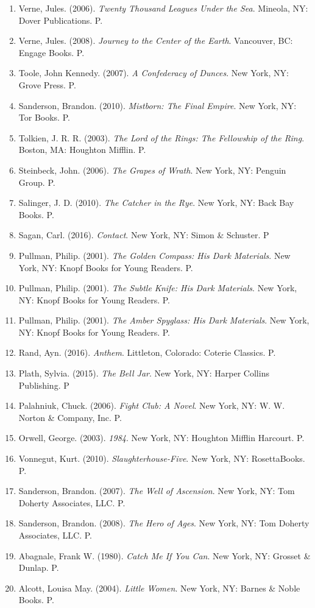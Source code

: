 \documentclass[11pt,a4paper]{article}
\begin{document}
\begin{enumerate}
   \item Verne, Jules. (2006). \textit{Twenty Thousand Leagues Under the Sea}. Mineola, NY: Dover Publications. P.
   \item Verne, Jules. (2008). \textit{Journey to the Center of the Earth}. Vancouver, BC: Engage Books. P.
   \item Toole, John Kennedy. (2007). \textit{A Confederacy of Dunces}. New York, NY: Grove Press. P.
   \item Sanderson, Brandon. (2010). \textit{Mistborn: The Final Empire}. New York, NY: Tor Books. P.
   \item Tolkien, J. R. R. (2003). \textit{The Lord of the Rings: The Fellowship of the Ring}. Boston, MA: Houghton Mifflin. P.
   \item Steinbeck, John. (2006). \textit{The Grapes of Wrath}. New York, NY: Penguin Group. P.
   \item Salinger, J. D. (2010). \textit{The Catcher in the Rye}. New York, NY: Back Bay Books. P.
   \item Sagan, Carl. (2016). \textit{Contact}. New York, NY: Simon \& Schuster. P
   \item Pullman, Philip. (2001). \textit{The Golden Compass: His Dark Materials}. New York, NY: Knopf Books for Young Readers. P. 
   \item Pullman, Philip. (2001). \textit{The Subtle Knife: His Dark Materials}. New York, NY: Knopf Books for Young Readers. P. 
   \item Pullman, Philip. (2001). \textit{The Amber Spyglass: His Dark Materials}. New York, NY: Knopf Books for Young Readers. P. 
   \item Rand, Ayn. (2016). \textit{Anthem}. Littleton, Colorado: Coterie Classics. P.
   \item Plath, Sylvia. (2015). \textit{The Bell Jar}. New York, NY: Harper Collins Publishing. P
   \item Palahniuk, Chuck. (2006). \textit{Fight Club: A Novel}. New York, NY: W. W. Norton \& Company, Inc. P.
   \item Orwell, George. (2003). \textit{1984}. New York, NY: Houghton Mifflin Harcourt. P.
   \item Vonnegut, Kurt. (2010). \textit{Slaughterhouse-Five}. New York, NY: RosettaBooks. P.
   \item Sanderson, Brandon. (2007). \textit{The Well of Ascension}. New York, NY: Tom Doherty Associates, LLC. P.
   \item Sanderson, Brandon. (2008). \textit{The Hero of Ages}. New York, NY: Tom Doherty Associates, LLC. P.
   \item Abagnale, Frank W. (1980). \textit{Catch Me If You Can}. New York, NY: Grosset \& Dunlap. P.
   \item Alcott, Louisa May. (2004). \textit{Little Women}. New York, NY: Barnes \& Noble Books. P.
   
\end{enumerate}
\end{document}
